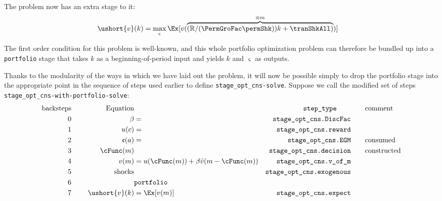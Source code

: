 \documentclass[\econtexRoot/BufferStockTheory]{subfiles}
\newcommand{\EOP}{\bar}
\newcommand{\MOP}{}
\newcommand{\BOP}{\ushort}
\begin{document}
The problem now has an extra stage to it:
\begin{align*}
  \BOP{v}(k) & = \max_{\varsigma} \Ex[\MOP{v}(\overbrace{(\mathbb{R}/(\PermGroFac \permShk))k+\tranShkAll)}^{\equiv m})]
\end{align*}

The first order condition for this problem is well-known, and this whole portfolio optimization problem can therefore be bundled up into a \texttt{portfolio} stage that takes $k$ as a beginning-of-period input and yields $k$ and $\varsigma$ as outputs.

Thanks to the modularity of the ways in which we have laid out the problem, it will now be possible simply to drop the portfolio stage into the appropriate point in the sequence of steps used earlier to define \texttt{stage\_opt\_cns-solve}.  Suppose we call the modified set of steps \texttt{stage\_opt\_cns-with-portfolio-solve}:\pagebreak
\begin{alignat*}{3}
\text{backsteps} &      &   \notag \text{Equation} & \qquad                                    & \qquad \texttt{step\_type} \qquad  & \qquad \text{comment}
\\ 0             & ~~~~ & \beta                    & =                                         & \texttt{stage\_opt\_cns.DiscFac}   & %
\\ 1             & ~~~~ &   u(c)                   & =                                         & \texttt{stage\_opt\_cns.reward}    & 
\\ 2             & ~~~~ &   \mathfrak{c}(a)        & =                                         & \texttt{stage\_opt\_cns.EGM}       & \qquad \text{consumed}
\\ 3             & ~~~~ &   \cFunc(m)              &                                           & \texttt{stage\_opt\_cns.decision}  & \qquad \text{constructed} %
\\ 4             & ~~~~ & \MOP{v}(m)               & = u(\cFunc(m))+\beta \EOP{v}(m-\cFunc(m)) & \texttt{stage\_opt\_cns.v\_of\_m}  &
\\ 5             & ~~~~ & \text{shocks}            &                                           & \texttt{stage\_opt\_cns.exogenous} & %
\\ 6             & ~~~~ &                          & \texttt{portfolio}                        &
\\ 7             & ~~~~ & \BOP{v}(k)               & = \Ex[\MOP{v}(m)]                         & \texttt{stage\_opt\_cns.expect}    & %
\end{alignat*}
\end{document}
